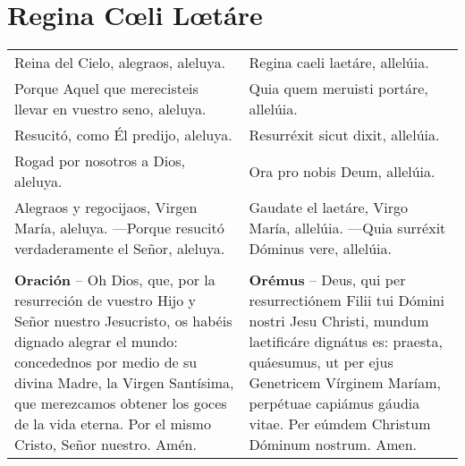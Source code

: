 \section*{Regina Cœli Lœtáre}
\begin{longtable} { p{} p{} }

    Reina del Cielo, alegraos, aleluya.                                                           & Regina caeli laetáre, allelúia.               \\
    Porque Aquel que merecisteis llevar en vuestro seno, aleluya.                                 & Quia quem meruisti portáre, allelúia.         \\
    Resucitó, como Él predijo, aleluya.                                                           & Resurréxit sicut dixit, allelúia.             \\
    Rogad por nosotros a Dios, aleluya.                                                           & Ora pro nobis Deum, allelúia.                 \\
    Alegraos y regocijaos, Virgen María, aleluya. ---Porque resucitó verdaderamente el Señor, aleluya.                                             
    
     & 
     
    Gaudate el laetáre, Virgo María, allelúia. ---Quia surréxit Dóminus vere, allelúia.      \\\\
    \textbf{Oración} -- Oh Dios, que, por la resurreción de vuestro Hijo y Señor nuestro Jesucristo,
    os habéis dignado alegrar el mundo: concedednos por medio de su divina Madre, la Virgen Santísima,
    que merezcamos obtener los goces de la vida eterna. Por el mismo Cristo, Señor nuestro. Amén. 
    
     &
    
    \textbf{Orémus} -- Deus, qui per resurrectiónem Filii tui Dómini nostri Jesu Christi,
    mundum laetificáre dignátus es: praesta, quáesumus, ut per ejus Genetricem Vírginem Maríam,
    perpétuae capiámus gáudia vitae. Per eúmdem Christum Dóminum nostrum. Amen.
\end{longtable}
